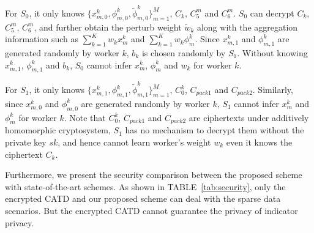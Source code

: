 \documentclass[conference]{IEEEtran}
\begin{document}
For $S_0$, it only knows $\{x_{m,0}^k, \phi_{m,0}^k, \tilde{\phi}_{m,0}^k\}_{m=1}^M$, $C_k$, $C_5^m$ and $C_6^m$.
$S_0$ can decrypt $C_k$, $C_5^m$, $C_6^m$, and further obtain the perturb weight $\tilde{w}_k$ along with the aggregation information such as $\sum_{k=1}^K w_k x_m^k$ and $\sum_{k=1}^K w_k \phi_m^k$.
Since $x_{m,1}^k$ and $\phi_{m,1}^k$ are generated randomly by worker $k$, $b_k$ is chosen randomly by $S_1$.
Without knowing $x_{m,1}^k$, $\phi_{m,1}^k$ and $b_k$, $S_0$ cannot infer $x_m^k$, $\phi_m^k$ and $w_k$ for worker $k$.

For $S_1$, it only knows $\{x_{m,1}^k, \phi_{m,1}^k, \tilde{\phi}_{m,1}^k\}_{m=1}^M$, $C_0^k$, $C_{pack1}$ and $C_{pack2}$.
Similarly, since $x_{m,0}^k$ and $\phi_{m,0}^k$ are generated randomly by worker $k$, $S_1$ cannot infer $x_m^k$ and $\phi_m^k$ for worker $k$.
Note that $C_0^k$, $C_{pack1}$ and $C_{pack2}$ are ciphertexts under additively homomorphic cryptosystem, $S_1$ has no mechanism to decrypt them without the private key $sk$, and hence cannot learn worker's weight $w_k$ even it knows the ciphertext $C_k$.

Furthermore, we present the security comparison between the proposed scheme with state-of-the-art schemes.
As shown in TABLE~\ref{tab:security}, only the encrypted CATD and our proposed scheme can deal with the sparse data scenarios.
But the encrypted CATD cannot guarantee the privacy of indicator privacy.
\end{document}
